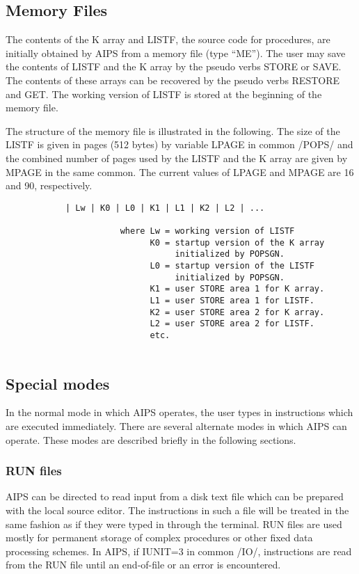 \subsection{Memory Files }
The contents of the K array and LISTF, the source code for procedures,
are initially obtained by AIPS from a memory file (type ``ME'').  The
user may save the contents of LISTF and the K array by the pseudo
verbs STORE or SAVE.  The contents of these arrays can be recovered by
the pseudo verbs RESTORE and GET.  The working version of LISTF is
stored at the beginning of the memory file.

The structure of the memory file is illustrated in the following. The
size of the LISTF is given in pages (512 bytes) by variable LPAGE in
common /POPS/ and the combined number of pages used by the LISTF and
the K array are given by MPAGE in the same common.  The current values
of LPAGE and MPAGE are 16 and 90, respectively.

\begin{verbatim}
            | Lw | K0 | L0 | K1 | L1 | K2 | L2 | ...

                       where Lw = working version of LISTF
                             K0 = startup version of the K array
                                  initialized by POPSGN.
                             L0 = startup version of the LISTF
                                  initialized by POPSGN.
                             K1 = user STORE area 1 for K array.
                             L1 = user STORE area 1 for LISTF.
                             K2 = user STORE area 2 for K array.
                             L2 = user STORE area 2 for LISTF.
                             etc.


\end{verbatim}

\subsection{Special modes}
In the normal mode in which AIPS operates, the user types in
instructions which are executed immediately.  There are several
alternate modes in which AIPS can operate.  These modes are described
briefly in the following sections.

\subsubsection{RUN files}
AIPS can be directed to read input from a disk text file which can be
prepared with the local source editor.  The instructions in such a
file will be treated in the same fashion as if they were typed in
through the terminal.  RUN files are used mostly for permanent storage
of complex procedures or other fixed data processing schemes. In AIPS,
if IUNIT=3 in common /IO/, instructions are read from the RUN file
until an end-of-file or an error is encountered.

